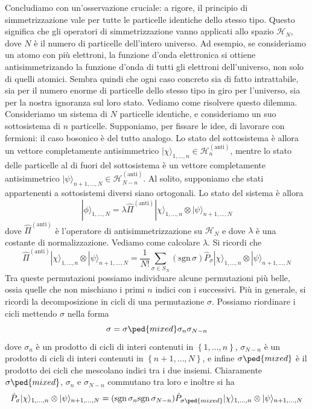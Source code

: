 \documentclass[a4paper, 11pt]{article}
\newcommand{\op}[1]{\hat{#1}}
\renewcommand{\H}{\mathcal{H}}
\renewcommand{\op}[1]{\hat{#1}}
\renewcommand{\ket}[1]{| #1\rangle}
\begin{document}
Concludiamo con un'osservazione cruciale: a rigore, il principio di simmetrizzazione vale per tutte le particelle identiche dello stesso tipo. Questo significa che gli operatori di simmetrizzazione vanno applicati allo spazio $\H_N$, dove $N$ è il numero di particelle dell'intero universo. Ad esempio, se consideriamo un atomo con più elettroni, la funzione d'onda elettronica si ottiene antisimmetrizando la funzione d'onda di tutti gli elettroni dell'universo, non solo di quelli atomici. Sembra quindi che ogni caso concreto sia di fatto intrattabile, sia per il numero enorme di particelle dello stesso tipo in giro per l'universo, sia per la nostra ignoranza sul loro stato. Vediamo come risolvere questo dilemma. Consideriamo un sistema di $N$ particelle identiche, e consideriamo un suo sottosistema di $n$ particelle. Supponiamo, per fissare le idee, di lavorare con fermioni: il caso bosonico è del tutto analogo. Lo stato del sottosistema è allora un vettore completamente antisimmetrico $\ket{\chi}_{1,\ldots,n}\in\H_n^{(\textrm{anti})}$, mentre lo stato delle particelle al di fuori del sottosistema è un vettore completamente antisimmetrico $\ket{\psi}_{n+1,\ldots,N}\in\H_{N-n}^{(\textrm{anti})}$. Al solito, supponiamo che stati appartenenti a sottosistemi diversi siano ortogonali. Lo stato del sistema è allora
\[\ket{\phi}_{1,\ldots,N}=\lambda\op{\Pi}^{(\textrm{anti})}\ket{\chi}_{1,\ldots,n}\otimes\ket{\psi}_{n+1,\ldots,N}\]
dove $\op{\Pi}^{(\textrm{anti})}$ è l'operatore di antisimmetrizzazione su $\H_N$ e dove $\lambda$ è una costante di normalizzazione. Vediamo come calcolare $\lambda$. Si ricordi che
\[\op{\Pi}^{(\textrm{anti})}\ket{\chi}_{1,\ldots,n}\otimes\ket{\psi}_{n+1,\ldots,N}=\frac{1}{N!}\sum_{\sigma\in S_N}(\mathrm{sgn}\,\sigma)\op P_{\sigma}\ket{\chi}_{1,\ldots,n}\otimes\ket{\psi}_{n+1,\ldots,N}\]
Tra queste permutazioni possiamo individuare alcune permutazioni più belle, ossia quelle che non mischiano i primi $n$ indici con i successivi. Più in generale, si ricordi la decomposizione in cicli di una permutazione $\sigma$. Possiamo riordinare i cicli mettendo $\sigma$ nella forma
\[\sigma=\sigma\ped{mixed}\sigma_n\sigma_{N-n}\]
dove $\sigma_n$ è un prodotto di cicli di interi contenuti in $\left\{1,\ldots,n\right\}$, $\sigma_{N-n}$ è un prodotto di cicli di interi contenuti in $\left\{n+1,\ldots,N\right\}$, e infine $\sigma\ped{mixed}$ è il prodotto dei cicli che mescolano indici tra i due insiemi. Chiaramente $\sigma\ped{mixed}$, $\sigma_n$ e $\sigma_{N-n}$ commutano tra loro e inoltre si ha
\[\op P_\sigma\ket{\chi}_{1,\ldots,n}\otimes\ket{\psi}_{n+1,\ldots,N}=(\mathrm{sgn}\,\sigma_n\mathrm{sgn}\,\sigma_{N-n})\op P_{\sigma\ped{mixed}}\ket{\chi}_{1,\ldots,n}\otimes\ket{\psi}_{n+1,\ldots,N}\]
\end{document}
